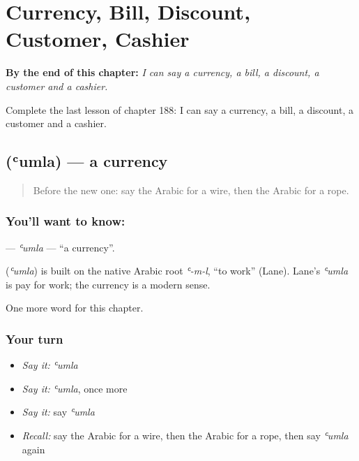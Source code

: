 
\chapter{Currency, Bill, Discount, Customer, Cashier}
\label{ch:ar-currency-bill-discount-customer-cashier}

\begin{chapteropening}
\textbf{By the end of this chapter:} \emph{I can say a currency, a bill, a discount, a customer and a cashier.}

Complete the last lesson of chapter 188: I can say a currency, a bill, a discount, a customer and a cashier.
\end{chapteropening}

\section[\texorpdfstring{\ar{عملة} (ʿumla)}{عملة (ʿumla)}]{ (ʿumla) — a currency}

\label{lesson:AR-C188-umla}



\begin{quote}
Before the new one: say the Arabic for a wire, then the Arabic for a rope.
\end{quote}

\subsection*{You'll want to know: }
\textbf{} — \emph{ʿumla} — \textquotedblleft{}a currency\textquotedblright{}.

\begin{cousinweb}
\textbf{} (\emph{ʿumla}) is built on the native Arabic root \emph{ʿ-m-l}, \textquotedblleft{}to work\textquotedblright{} (Lane). Lane's \emph{ʿumla} is pay for work; the currency is a modern sense.
\end{cousinweb}

\begin{grammarlens}[title={What you've built}]
One more word for this chapter.
\end{grammarlens}

\subsection*{Your turn}
\begin{itemize}
\raggedright
  \item \emph{Say it:} \emph{ʿumla}
  \item \emph{Say it:} \emph{ʿumla}, once more
  \item \emph{Say it:} say \emph{ʿumla}
  \item \emph{Recall:} say the Arabic for a wire, then the Arabic for a rope, then say \emph{ʿumla} again
\end{itemize}

